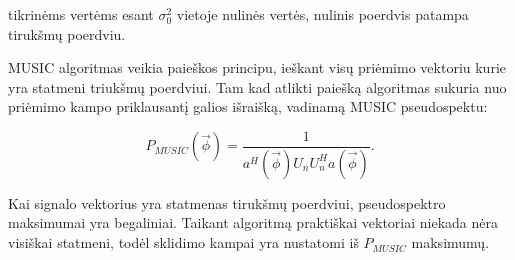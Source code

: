 \documentclass[main.tex]{subfiles}
\begin{document}
\noindent tikrinėms vertėms esant $\sigma^2_0$ vietoje nulinės vertės, nulinis
poerdvis patampa tirukšmų poerdviu.

MUSIC algoritmas veikia paieškos principu, ieškant visų priėmimo vektoriu kurie
yra statmeni triukšmų poerdviui. Tam kad atlikti paiešką algoritmas sukuria
nuo priėmimo kampo priklausantį galios išraišką, vadinamą MUSIC pseudospektu:

\begin{equation}
    P_{MUSIC}(\overrightarrow{\phi}) = \frac{1}{a^H(\overrightarrow{\phi})U_nU_n^Ha(\overrightarrow{\phi})}.
\end{equation}

\noindent Kai signalo vektorius yra statmenas tirukšmų poerdviui, pseudospektro maksimumai
yra begaliniai. Taikant algoritmą praktiškai vektoriai niekada nėra visiškai statmeni,
todėl sklidimo kampai yra nustatomi iš $P_{MUSIC}$ maksimumų.
\end{document}
